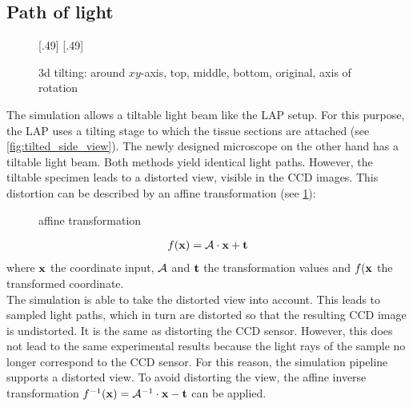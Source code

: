 \subsection{Path of light}
% 
\begin{figure}[!t]
\def\tikzheight{0.42\textwidth}
[.49\textwidth]{
}\hfill
{}[.49\textwidth]{
}
\tikzset{external/export=false}
\caption[3d tilting]{3d tilting: around $xy$-axis, \raisebox{.25em}{\tikz \draw[red,thick](0,0)--(0.25,0);} top, \raisebox{.25em}{\tikz \draw[green,thick](0,0)--(0.25,0);} middle, \raisebox{.25em}{\tikz \draw[blue,thick](0,0)--(0.25,0);} bottom, \raisebox{.25em}{\tikz \draw[dash pattern=on 1.25pt off 1.25pt,thick](0,0)--(0.25,0);} original, \raisebox{.25em}{\tikz \draw[gray](0,0)--(0.25,0);} axis of rotation }
\end{figure}
% 
The simulation allows a tiltable light beam like the \ac{LAP} setup.
For this purpose, the \ac{LAP} uses a tilting stage to which the tissue sections are attached (see \cref{fig:tilted_side_view}). 
The newly designed microscope on the other hand has a tiltable light beam.
Both methods yield identical light paths.
However, the tiltable specimen leads to a distorted view, visible in the \ac{CCD} images.
This distortion can be described by an affine transformation (see \cref{fig::affine_transformation}):
% 
\begin{figure}[!t]
\centering

\caption{affine transformation}
\label{fig::affine_transformation}
\end{figure}
% 
\begin{align}
f(\mathbf{x}) = \mathcal{A} \cdot \mathbf{x} + \mathbf{t}
\end{align}
where $\mathbf{x}$ the coordinate input, $\mathcal{A}$ and $\mathbf{t}$ the transformation values and $f(\mathbf{x}$ the transformed coordinate.
\\
% 
The simulation is able to take the distorted view into account.
This leads to sampled light paths, which in turn are distorted so that the resulting \ac{CCD} image is undistorted.
It is the same as distorting the \ac{CCD} sensor.
However, this does not lead to the same experimental results because the light rays of the sample no longer correspond to the \ac{CCD} sensor.
For this reason, the simulation pipeline supports a distorted view.
To avoid distorting the view, the affine inverse transformation $f^{-1}(\mathbf{x}) = \mathcal{A}^{-1} \cdot \mathbf{x} - \mathbf{t}$ can be applied.
